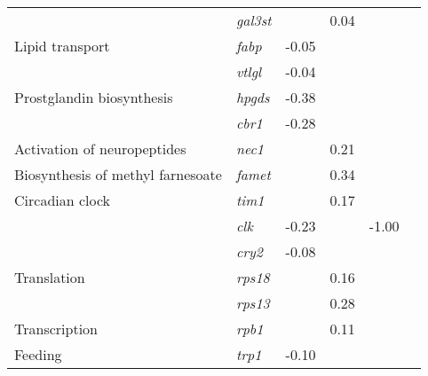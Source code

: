 \begin{table}[]
\begin{tabular}{@{}llllll@{}}
                                      & \textit{gal3st} & \cellcolor[HTML]{C0C0C0}      & 0.04           & \cellcolor[HTML]{C0C0C0}      &          \\
Lipid transport                       & \textit{fabp}   & \cellcolor[HTML]{C0C0C0}-0.05 &                & \cellcolor[HTML]{C0C0C0}      &          \\
                                      & \textit{vtlgl}  & \cellcolor[HTML]{C0C0C0}-0.04 &                & \cellcolor[HTML]{C0C0C0}      &          \\
Prostglandin biosynthesis             & \textit{hpgds}  & \cellcolor[HTML]{C0C0C0}-0.38 &                & \cellcolor[HTML]{C0C0C0}      &          \\
                                      & \textit{cbr1}   & \cellcolor[HTML]{C0C0C0}-0.28 &                & \cellcolor[HTML]{C0C0C0}      &          \\
Activation of neuropeptides           & \textit{nec1}   & \cellcolor[HTML]{C0C0C0}      & 0.21           & \cellcolor[HTML]{C0C0C0}      &          \\
Biosynthesis of methyl farnesoate     & \textit{famet}  & \cellcolor[HTML]{C0C0C0}      & 0.34           & \cellcolor[HTML]{C0C0C0}      &          \\
Circadian clock                       & \textit{tim1}   & \cellcolor[HTML]{C0C0C0}      & 0.17           & \cellcolor[HTML]{C0C0C0}      &          \\
                                      & \textit{clk}    & \cellcolor[HTML]{C0C0C0}-0.23 &                & \cellcolor[HTML]{C0C0C0}-1.00 &          \\
                                      & \textit{cry2}   & \cellcolor[HTML]{C0C0C0}-0.08 &                & \cellcolor[HTML]{C0C0C0}      &          \\
Translation                           & \textit{rps18}  & \cellcolor[HTML]{C0C0C0}      & 0.16           & \cellcolor[HTML]{C0C0C0}      &          \\
                                      & \textit{rps13}  & \cellcolor[HTML]{C0C0C0}      & 0.28           & \cellcolor[HTML]{C0C0C0}      &          \\
Transcription                         & \textit{rpb1}   & \cellcolor[HTML]{C0C0C0}      & 0.11           & \cellcolor[HTML]{C0C0C0}      &          \\
Feeding                               & \textit{trp1}   & \cellcolor[HTML]{C0C0C0}-0.10 &                & \cellcolor[HTML]{C0C0C0}      &          \\

\end{tabular}
\end{table}
